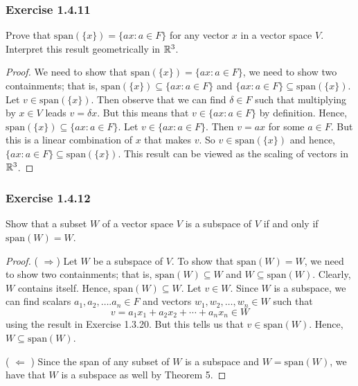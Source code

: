 \subsubsection{Exercise 1.4.11} Prove that \( \text{span}(\{x\} ) = \{ ax : a \in F  \}  \) for any vector \( x  \) in a vector space \( V  \). Interpret this result geometrically in \( \mathbb{R}^{3} \).
\begin{proof}
We need to show that \( \text{span}(\{ x \} ) = \{ a x : a \in F  \}  \), we need to show two containments; that is, \( \text{span}(\{ x \} ) \subseteq \{ ax : a \in F  \}  \) and \( \{ ax : a \in F  \} \subseteq \text{span}(\{ x \} ) \). Let \( v \in \text{span}(\{ x \} ) \). Then observe that we can find \( \delta \in F  \) such that multiplying by \( x \in V  \) leads \( v = \delta x     \). But this means that \( v \in \{ ax : a \in F  \}  \) by definition. Hence, \( \text{span}(\{ x \} ) \subseteq \{ ax : a \in F  \}    \). Let \( v \in \{ ax : a \in F  \}  \). Then \( v = a x  \) for some \( a \in F  \). But this is a linear combination of \( x  \) that makes \( v  \). So \( v \in \text{span}(\{ x \} ) \) and hence, \( \{ ax : a \in F  \} \subseteq \text{span}(\{ x \} ) \). This result can be viewed as the scaling of vectors in \( \mathbb{R}^{3} \).
\end{proof}

\subsubsection{Exercise 1.4.12} Show that a subset \( W  \) of a vector space \( V  \) is a subspace of \( V  \) if and only if \( \text{span}(W) = W  \). 

\begin{proof}
    ( \( \Rightarrow \)) Let \( W  \) be a subspace of \( V  \). To show that \( \text{span}(W) = W  \), we need to show two containments; that is, \( \text{span}(W) \subseteq W  \) and \( W \subseteq \text{span}(W) \). Clearly, \( W  \) contains itself. Hence, \( \text{span}(W) \subseteq W  \). Let \( v \in W  \). Since \( W  \) is a subspace, we can find scalars \( a_{1} , a_{2} , \dots. a_{n} \in F  \) and vectors \( w_{1} , w_{2} , \dots, w_{n} \in W  \) such that 
    \[  v = a_{1} x_{1} + a_{2} x_{2} + \cdots + a_{n} x_{n} \in W \]
    using the result in Exercise 1.3.20. But this tells us that \( v \in \text{span}(W) \). Hence, \( W \subseteq \text{span}(W) \).

    ( \( \Leftarrow \) ) Since the span of any subset of \(  W   \) is a subspace and \( W = \text{span}(W)  \), we have that \( W  \) is a subspace as well by Theorem 5.
\end{proof}
